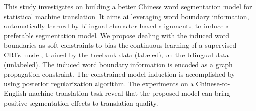 This study investigates on building a better Chinese word segmentation model for statistical machine translation. It aims at leveraging word boundary information, automatically learned by bilingual character-based alignments, to induce a preferable segmentation model. We propose dealing with the induced word boundaries as soft constraints to bias the continuous learning of a supervised CRFs model, trained by the treebank data (labeled), on the bilingual data (unlabeled). The induced word boundary information is encoded as a graph propagation constraint. The constrained model induction is accomplished by using posterior regularization algorithm. The experiments on a Chinese-to-English machine translation task reveal that the proposed model can bring positive segmentation effects to translation quality.
